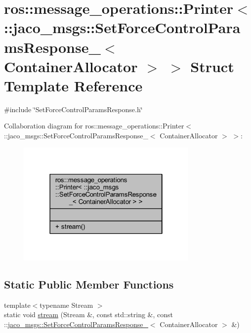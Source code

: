 \hypertarget{structros_1_1message__operations_1_1Printer_3_01_1_1jaco__msgs_1_1SetForceControlParamsResponse_198e4d90f16b65b33174a1d2bb51e7bf}{}\section{ros\+:\+:message\+\_\+operations\+:\+:Printer$<$ \+:\+:jaco\+\_\+msgs\+:\+:Set\+Force\+Control\+Params\+Response\+\_\+$<$ Container\+Allocator $>$ $>$ Struct Template Reference}
\label{structros_1_1message__operations_1_1Printer_3_01_1_1jaco__msgs_1_1SetForceControlParamsResponse_198e4d90f16b65b33174a1d2bb51e7bf}


{\ttfamily \#include \char`\"{}Set\+Force\+Control\+Params\+Response.\+h\char`\"{}}



Collaboration diagram for ros\+:\+:message\+\_\+operations\+:\+:Printer$<$ \+:\+:jaco\+\_\+msgs\+:\+:Set\+Force\+Control\+Params\+Response\+\_\+$<$ Container\+Allocator $>$ $>$\+:
\nopagebreak
\begin{figure}[H]
\begin{center}
\leavevmode
\includegraphics[width=250pt]{d2/ded/structros_1_1message__operations_1_1Printer_3_01_1_1jaco__msgs_1_1SetForceControlParamsResponse_bba4601086b04434638ed62682be5f1c}
\end{center}
\end{figure}
\subsection*{Static Public Member Functions}
\begin{DoxyCompactItemize}
\item 
{\footnotesize template$<$typename Stream $>$ }\\static void \hyperlink{structros_1_1message__operations_1_1Printer_3_01_1_1jaco__msgs_1_1SetForceControlParamsResponse_198e4d90f16b65b33174a1d2bb51e7bf_a0ee4a0ca598e408862ceff02b8377a69}{stream} (Stream \&, const std\+::string \&, const \+::\hyperlink{structjaco__msgs_1_1SetForceControlParamsResponse__}{jaco\+\_\+msgs\+::\+Set\+Force\+Control\+Params\+Response\+\_\+}$<$ Container\+Allocator $>$ \&)
\end{DoxyCompactItemize}


